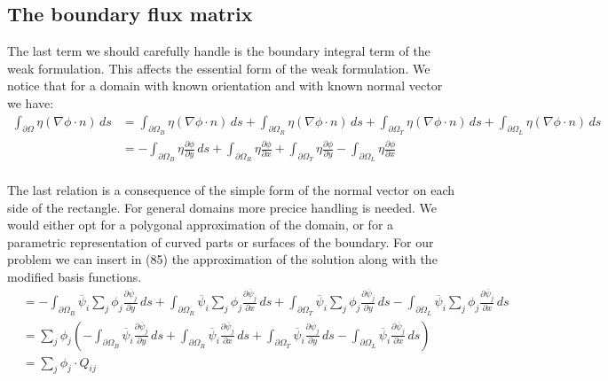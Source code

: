 \documentclass{article}
\begin{document}
\subsection{The boundary flux matrix}
The last term we should carefully handle is the boundary integral term of the weak formulation. This affects the essential form of the weak formulation. We notice that for a domain with known orientation and with known normal vector we have:\\

\begin{align}
\int_{\partial{\Omega}}\eta(\nabla\phi\cdot n)\,ds 
&=
\int_{\partial{\Omega_B}}\eta(\nabla\phi\cdot n)\,ds + \int_{\partial{\Omega_R}}\eta(\nabla\phi\cdot n)\,ds +
\int_{\partial{\Omega_T}}\eta(\nabla\phi\cdot n)\,ds +
\int_{\partial{\Omega_L}}\eta(\nabla\phi\cdot n)\,ds \\
&=
-\int_{\partial{\Omega_B}}\eta\frac{\partial{\phi}}{\partial y}\,ds + \int_{\partial{\Omega_R}}\eta\frac{\partial{\phi}}{\partial x} +
\int_{\partial{\Omega_T}}\eta\frac{\partial{\phi}}{\partial y} -
\int_{\partial{\Omega_L}}\eta\frac{\partial{\phi}}{\partial x} 
\end{align}\\

The last relation is a consequence of the simple form of the normal vector on each side of the rectangle. For general domains more precice handling is needed. We would either opt for a polygonal approximation of the domain, or for a parametric representation of curved parts or surfaces of the boundary. For our problem we can insert in (85) the approximation of the solution along with the modified basis functions.\\

\begin{align}
&=-\int_{\partial{\Omega_B}}\overline{\psi}_i\sum_{j}\phi_j\frac{\partial{\overline{\psi}_j}}{\partial y}\,ds + \int_{\partial{\Omega_R}}\overline{\psi}_i\sum_{j}\phi_j\frac{\partial{\overline{\psi}_j}}{\partial x}\,ds +
\int_{\partial{\Omega_T}}\overline{\psi}_i\sum_{j}\phi_j\frac{\partial{\overline{\psi}_j}}{\partial y}\,ds -
\int_{\partial{\Omega_L}}\overline{\psi}_i\sum_{j}\phi_j\frac{\partial{\overline{\psi}_j}}{\partial x}\,ds \\
&=\sum_{j}\phi_j(-\int_{\partial{\Omega_B}}\overline{\psi}_i \frac{\partial{\overline{\psi}_j}}{\partial y}\,ds +
\int_{\partial{\Omega_R}}\overline{\psi}_i \frac{\partial{\overline{\psi}_j}}{\partial x}\,ds +
\int_{\partial{\Omega_T}}\overline{\psi}_i \frac{\partial{\overline{\psi}_j}}{\partial y}\,ds -
\int_{\partial{\Omega_L}}\overline{\psi}_i \frac{\partial{\overline{\psi}_j}}{\partial x}\,ds)\\
&=\sum_{j}\phi_j\cdot Q_{ij} 
\end{align}\\
\end{document}
